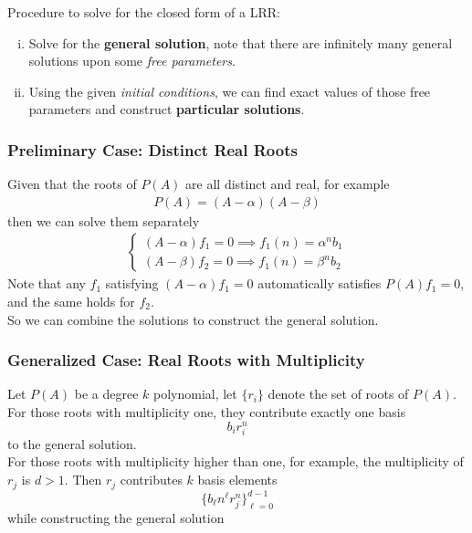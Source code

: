 \documentclass{article}
\begin{document}
				\begin{remark}Procedure to solve for the closed form of a LRR:
					\begin{enumerate}[(i)]
						\item Solve for the \textbf{general solution}, note that there are infinitely many general solutions upon some \emph{free parameters}.
						\item Using the given \emph{initial conditions}, we can find exact values of those free parameters and construct \textbf{particular solutions}.
					\end{enumerate}
				\end{remark}
				
				\subsubsection{Preliminary Case: Distinct Real Roots}
					\begin{remark}
						Given that the roots of $P(A)$ are all distinct and real, for example
						\begin{gather}
							P(A) = (A - \alpha) (A - \beta)
						\end{gather}
						then we can solve them separately
						\begin{gather}
							\begin{cases}
								(A - \alpha) f_1 = 0 \implies f_1(n) = \alpha^n b_1 \\
								(A - \beta) f_2 = 0 \implies f_1(n) = \beta^n b_2
							\end{cases}
						\end{gather}
						Note that any $f_1$ satisfying $(A - \alpha) f_1 = 0$ automatically satisfies $P(A) f_1 = 0$, and the same holds for $f_2$.\\
						So we can combine the solutions to construct the general solution.
					\end{remark}
				
				\subsubsection{Generalized Case: Real Roots with Multiplicity}
					\begin{remark}
						Let $P(A)$ be a degree $k$ polynomial, let $\{r_i\}$ denote the set of roots of $P(A)$. For those roots with multiplicity one, they contribute exactly one basis
						\begin{equation}
							b_i r_i^n	
						\end{equation}
						to the general solution. \\For those roots with multiplicity higher than one, for example, the multiplicity of $r_j$ is $d > 1$. Then $r_j$ contributes $k$ basis elements
						\begin{equation}
							\{b_{\ell} n^{\ell} r_j^n\}_{\ell = 0}^{d-1}
						\end{equation}
						while constructing the general solution
					\end{remark}
				
\end{document}
